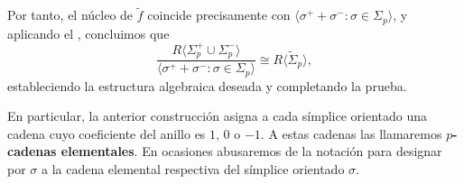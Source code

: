 Por tanto, el núcleo de \(\tilde{f}\) coincide precisamente con
\(\langle \sigma^{+}+ \sigma^{-}: \sigma \in \Sigma_{p}\rangle\), y aplicando el ,
concluimos que
\[
\frac{R\langle \Sigma_{p}^{+}\cup \Sigma_{p}^{-}\rangle}{\langle \sigma^{+}+
	\sigma^{-}: \sigma \in \Sigma_{p}\rangle}\cong R \langle \tilde{\Sigma}_{p}\rangle
,
\]
estableciendo la estructura algebraica deseada y completando la prueba.

\begin{observacion}
	En particular, la anterior construcción asigna a cada símplice orientado una
	cadena cuyo coeficiente del anillo es \(1\), \(0\) o \(-1\). A estas cadenas las
	llamaremos \textbf{\(p\)-cadenas elementales}. En ocasiones abusaremos de la
	notación para designar por \(\sigma\) a la cadena elemental respectiva del
	símplice orientado \(\sigma\).
\end{observacion}

